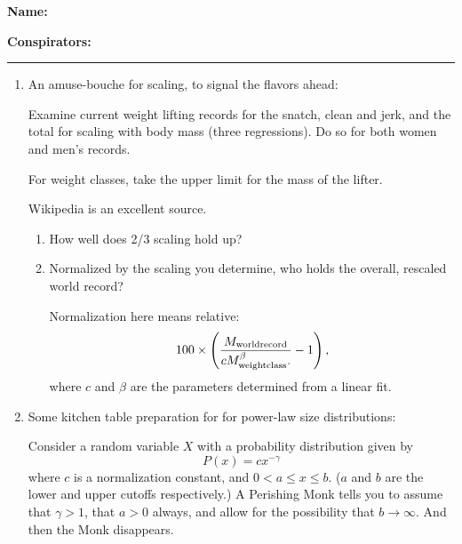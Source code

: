 \textbf{Name:} \\

\medskip

\textbf{Conspirators:} 

\medskip
\medskip

\hrule

\medskip


\begin{enumerate}

\item

  An amuse-bouche for scaling, to signal the flavors ahead:

  Examine current weight lifting records for
  the snatch, clean and jerk, and the total for scaling
  with body mass (three regressions).
  Do so for both women and men's records.

  For weight classes, take the upper limit 
  for the mass of the lifter.

  Wikipedia is an excellent source.

  \begin{enumerate}
  \item 
    How well does 2/3 scaling hold up?
  \item 
    Normalized by the scaling you determine,
    who holds the overall, rescaled world record?

    Normalization here means relative:
    $$
    100 \times 
    \left(
    \frac{
      M_{\rm world record}
    }{
      c M_{\rm weight class}^{\beta}.
    }
    -1
    \right),
    $$
    where $c$ and $\beta$ are the parameters
    determined from a linear fit.

  \end{enumerate}

  
   \solutionstart


   \solutionend

\item
  Some kitchen table preparation for for power-law size distributions:
  
  Consider a random variable $X$ with 
  a probability distribution given by
  $$
  P(x) = c x^{-\gamma}
  $$
  where $c$ is a normalization constant,
  and $0 < a \le x \le b $.
  ($a$ and $b$ are the lower and upper cutoffs respectively.)
  A Perishing Monk tells you to assume that $\gamma > 1$, that $a > 0$ always, and allow
  for the possibility that $b \rightarrow \infty$.
  And then the Monk disappears.


\end{enumerate}
